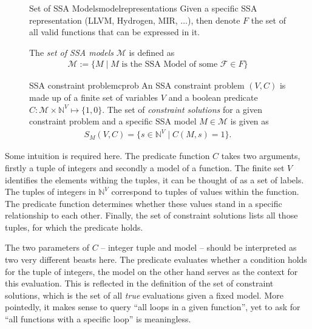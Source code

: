 \begin{figure}[H]
\begin{notation}{Set of SSA Models}{modelrepresentations}
    Given a specific SSA representation (LLVM, Hydrogen, MIR, $\dots$), then
    denote $F$ the set of all valid functions that can be expressed in it.

    The {\em set of SSA models} $\mathcal M$ is defined as
    \begin{align*}
        \mathcal M := \{M\mid M \text{ is the SSA Model of some }\mathcal F\in F\}
    \end{align*}
\end{notation}

\begin{definition}{SSA constraint problem}{cprob}
    An SSA constraint problem $(V,C)$ is made up of a finite set of variables
    $V$ and a boolean predicate
    $C\colon\mathcal M\times\mathbb N^V\mapsto\{1,0\}$.
    The set of {\em constraint solutions} for a given constraint problem and a
    specific SSA model $M\in\mathcal M$ is given as
    \begin{align*}
        S_M(V,C) = \{s\in\mathbb N^V\mid C(M,s)=1\}.
    \end{align*}
\end{definition}
\end{figure}

    Some intuition is required here.
    The predicate function $C$ takes two arguments, firstly a tuple of integers
    and secondly a model of a function.
    The finite set $V$ identifies the elements withing the tuples, it can be
    thought of as a set of labels.
    The tuples of integers in $\mathbb N^V$ correspond to tuples of values
    within the function.
    The predicate function determines whether these values stand in a specific
    relationship to each other.
    Finally, the set of constraint solutions lists all those tuples, for which
    the predicate holds.

    The two parameters of $C$ -- integer tuple and model -- should be
    interpreted as two very different beasts here.
    The predicate evaluates whether a condition holds for the tuple of integers,
    the model on the other hand serves as the context for this evaluation.
    This is reflected in the definition of the set of constraint solutions,
    which is the set of all {\em true} evaluations given a fixed model.
    More pointedly, it makes sense to query ``all loops in a given function'',
    yet to ask for ``all functions with a specific loop'' is meaningless.

